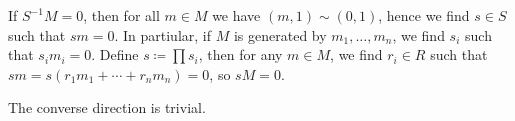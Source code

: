 If $S^{-1}M = 0$, then for all $m \in M$ we have
$(m, 1) \sim (0, 1)$, hence we find $s \in S$ such that $sm = 0$. In partiular,
if $M$ is generated by $m_1, \ldots, m_n$, we find $s_i$ such that $s_im_i = 0$.
Define  $s\coloneqq \prod s_i$, then for any $m \in M$, we find $r_i \in R$ such
that $sm = s(r_1m_1 + \cdots + r_nm_n) = 0$, so $sM = 0$.

The converse direction is trivial.
